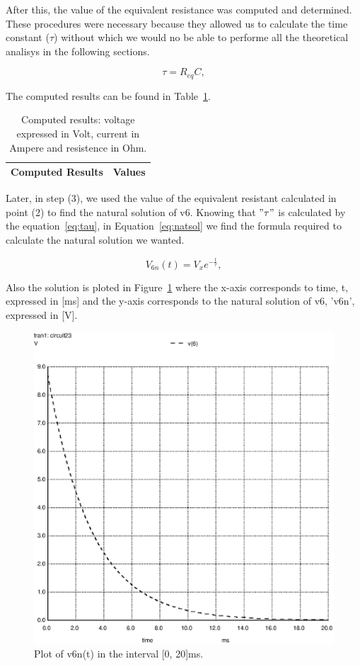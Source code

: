 After this, the value of the equivalent resistance was computed and determined. These procedures were necessary because they allowed us to calculate the time constant ($\tau$) without which we would no be able to performe all the theoretical analisys in the following sections. 

\begin{equation}
  \tau = R_{eq}C,
  \label{eq:tau}
\end{equation}


The computed results can be found in Table~\ref{tab:TA2}.

\begin{table}[h]
  \centering
  \begin{tabular}{|l|r|}
    \hline    
    {\bf Computed Results} & {\bf Values} \\ \hline
    
  \end{tabular}
  \caption{Computed results: voltage expressed in Volt, current in Ampere and resistence in Ohm.}
  \label{tab:TA2}
\end{table}

Later, in step (3), we used the value of the equivalent resistant calculated in point (2) to find the natural solution of v6. Knowing that $"\tau"$ is calculated by the equation~\ref{eq:tau}, in Equation~\ref{eq:natsol} we find the formula required to calculate the natural solution we wanted. 

\begin{equation}
  V_{6n}(t) = V_{x}e^{-\frac{t}{\tau}},
  \label{eq:natsol}
\end{equation}

Also the solution is ploted in Figure~\ref{fig:plotA(4)} where the x-axis corresponds to time, t, expressed in [ms] and the y-axis corresponds to the natural solution of v6, 'v6n', expressed in [V].

\vspace{5.0cm}

\begin{figure}[h] \centering
\includegraphics[width=0.8\linewidth]{naturalsolution.eps}
\caption{Plot of v6n(t) in the interval [0, 20]ms.}
\label{fig:plotA(4)}
\end{figure}

